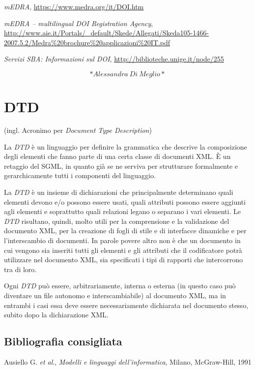 \documentclass[
  b5paper,
  twoside,
  12pt,
  chapterprefix=false,
  bibliography=totocnumbered,
  parskip=false]{scrbook}
\begin{document}
\emph{mEDRA}, \url{https://www.medra.org/it/DOI.htm}

\emph{mEDRA -- multilingual DOI Registration Agency},
\url{http://www.aie.it/Portals/_default/Skede/Allegati/Skeda105-1466-2007.5.2/Medra\%20brochure\%20applicazioni\%20IT.pdf}

\emph{Servizi SBA: Informazioni sul DOI},
\url{http://biblioteche.unige.it/node/255}

\[*Alessandra~Di~Meglio*\]

\hypertarget{dtd}{%
\chapter{DTD}\label{dtd}}

(ingl. Acronimo per \emph{Document Type Description})

La \emph{DTD} è un linguaggio per definire la grammatica che descrive la
composizione degli elementi che fanno parte di una certa classe di
documenti XML. È un retaggio del SGML, in quanto già se ne serviva per
strutturare formalmente e gerarchicamente tutti i componenti del
linguaggio.

La \emph{DTD} è un insieme di dichiarazioni che principalmente determinano
quali elementi devono e/o possono essere usati, quali attributi possono
essere aggiunti agli elementi e soprattutto quali relazioni legano o
separano i vari elementi. Le \emph{DTD} risultano, quindi, molto utili per la
comprensione e la validazione del documento XML, per la creazione di
fogli di stile e di interfacce dinamiche e per l'interscambio di
documenti. In parole povere altro non è che un documento in cui vengono
sia inseriti tutti gli elementi e gli attributi che il codificatore
potrà utilizzare nel documento XML, sia specificati i tipi di rapporti
che intercorrono tra di loro.

Ogni \emph{DTD} può essere, arbitrariamente, interna o esterna (in questo
caso può diventare un file autonomo e interscambiabile) al documento
XML, ma in entrambi i casi essa deve essere necessariamente dichiarata
nel documento stesso, subito dopo la dichiarazione XML.

\hypertarget{bibliografia-consigliata-8}{%
\section*{Bibliografia consigliata}\label{bibliografia-consigliata-8}}

Ausiello G. \emph{et al}., \emph{Modelli e linguaggi dell'informatica}, Milano,
McGraw-Hill, 1991
\end{document}
